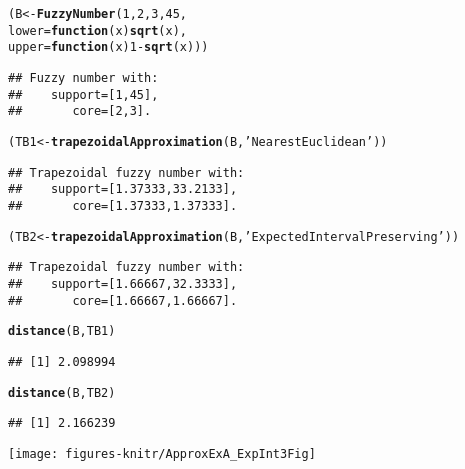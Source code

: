 \documentclass[11pt]{article}\usepackage{graphicx, color}
\makeatletter
\newcommand{\hlfunctioncall}[1]{\textcolor[rgb]{0.501960784313725,0,0.329411764705882}{\textbf{#1}}}%
\newcommand{\hlstring}[1]{\textcolor[rgb]{0.6,0.6,1}{#1}}%
\newenvironment{kframe}{%
 \def\at@end@of@kframe{}%
 \ifinner\ifhmode%
  \def\at@end@of@kframe{\end{minipage}}%
  \begin{minipage}{\columnwidth}%
 \fi\fi%
 \def\FrameCommand##1{\hskip\@totalleftmargin \hskip-\fboxsep
 \colorbox{shadecolor}{##1}\hskip-\fboxsep
     \hskip-\linewidth \hskip-\@totalleftmargin \hskip\columnwidth}%
 \MakeFramed {\advance\hsize-\width
   \@totalleftmargin\z@ \linewidth\hsize
   \@setminipage}}%
 {\par\unskip\endMakeFramed%
 \at@end@of@kframe}
\newenvironment{knitrout}{}{} %
\makeatother
\begin{document}
\begin{knitrout}\small
{}\color{fgcolor}\begin{kframe}
\begin{alltt}
(B  <- \hlfunctioncall{FuzzyNumber}(1, 2, 3, 45,
   lower=\hlfunctioncall{function}(x) \hlfunctioncall{sqrt}(x),
   upper=\hlfunctioncall{function}(x) 1-\hlfunctioncall{sqrt}(x)))
\end{alltt}
\begin{verbatim}
## Fuzzy number with:
##    support=[1,45],
##       core=[2,3].
\end{verbatim}
\begin{alltt}
(TB1 <- \hlfunctioncall{trapezoidalApproximation}(B, \hlstring{'NearestEuclidean'}))
\end{alltt}
\begin{verbatim}
## Trapezoidal fuzzy number with:
##    support=[1.37333,33.2133],
##       core=[1.37333,1.37333].
\end{verbatim}
\begin{alltt}
(TB2 <- \hlfunctioncall{trapezoidalApproximation}(B, \hlstring{'ExpectedIntervalPreserving'}))
\end{alltt}
\begin{verbatim}
## Trapezoidal fuzzy number with:
##    support=[1.66667,32.3333],
##       core=[1.66667,1.66667].
\end{verbatim}
\begin{alltt}
\hlfunctioncall{distance}(B, TB1)
\end{alltt}
\begin{verbatim}
## [1] 2.098994
\end{verbatim}
\begin{alltt}
\hlfunctioncall{distance}(B, TB2)
\end{alltt}
\begin{verbatim}
## [1] 2.166239
\end{verbatim}
\end{kframe}
\end{knitrout}


\begin{center}
\begin{knitrout}\small
{}\color{fgcolor}

{\centering \texttt{[image: figures-knitr/ApproxExA\_ExpInt3Fig]} 

}



\end{knitrout}

\end{center}
\end{document}
